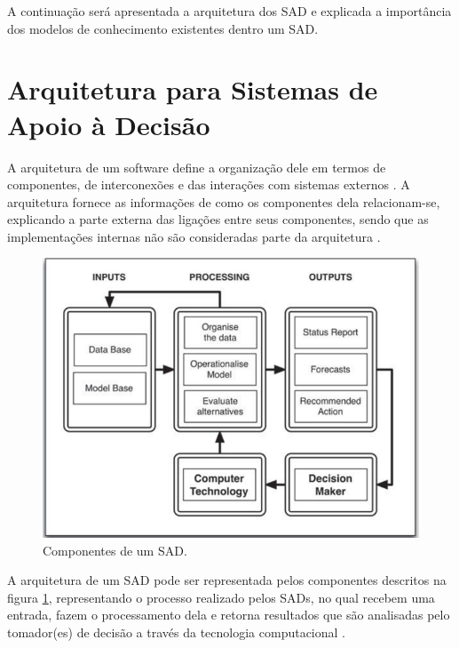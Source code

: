 A continuação será apresentada a arquitetura dos SAD e explicada a
importância dos modelos de conhecimento existentes dentro um SAD. 

\section{Arquitetura para Sistemas de Apoio à Decisão}

A arquitetura de um software define a organização dele em termos de
componentes, de interconexões e das interações com sistemas externos
\citep{de1997software}. A arquitetura fornece as informações de como
os componentes dela relacionam-se, explicando a parte externa das
ligações entre seus componentes, sendo que as implementações internas
não são consideradas parte da arquitetura \citep{sei2006architecture}.

\begin{figure}[H]
\noindent \begin{centering}
\includegraphics[width=0.9\columnwidth]{figures/DSS}
\par\end{centering}
\caption{Componentes de um SAD.\label{fig:Componentes-SAD} }

\end{figure}

A arquitetura de um SAD pode ser representada pelos componentes descritos
na figura \ref{fig:Componentes-SAD}, representando o processo realizado
pelos SADs, no qual recebem uma entrada, fazem o processamento dela
e retorna resultados que são analisadas pelo tomador(es) de decisão
a través da tecnologia computacional \citep{Tweedale2016}. 

